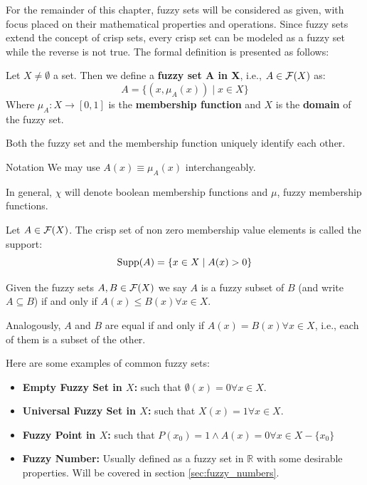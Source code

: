 For the remainder of this chapter, fuzzy sets will be considered as given, with focus placed on their mathematical properties and operations. Since fuzzy sets extend the concept of crisp sets, every crisp set can be modeled as a fuzzy set while the reverse is not true. The formal definition is presented as follows:

\begin{definition}
    Let $X\neq\emptyset$ a set. Then we define a \textbf{fuzzy set A in X}, i.e., $A \in \mathcal{F}(X)$ as:
    \[A=\{(x,\mu_A(x))\mid x\in X\}\]
    Where $\mu_A:X\longrightarrow [0,1]$ is the \textbf{membership function} and $X$ is the \textbf{domain} of the fuzzy set.
\end{definition}

\begin{remark}
     Both the fuzzy set and the membership function uniquely identify each other.
\end{remark}

\begin{notation}{Notation}
    We may use \( A(x) \equiv \mu_A(x) \) interchangeably.

    In general, $\chi$ will denote boolean membership functions and $\mu$, fuzzy membership functions.
\end{notation}



\begin{definition}[Support]
    Let $A \in \mathcal{F}(X)$. The crisp set of non zero membership value elements is called the support:
    \[\textnormal{Supp}(A)=\{x\in X \mid A(x)>0\}\]
\end{definition}

\begin{definition}
    Given the fuzzy sets $A, B \in \mathcal{F}(X)$ we say $A$ is a fuzzy subset of $B$ (and write $A \subseteq B$) if and only if $A(x)
    \leq B(x) \forall x \in X$.

    Analogously, $A$ and $B$ are equal if and only if $A(x)=B(x) \forall x \in X$, i.e., each of them is a subset of the other.
\end{definition}

\begin{example}
    Here are some examples of common fuzzy sets:
    \begin{itemize}
        \item \textbf{Empty Fuzzy Set in $X$:} such that $\emptyset(x)=0 \forall x \in X$.
        \item \textbf{Universal Fuzzy Set in $X$:} such that $X(x)=1  \forall x \in X$.
        \item \textbf{Fuzzy Point in $X$:} such that $P(x_0)=1 \land A(x)=0 \forall x \in X-\{x_0\}$
        \item \textbf{Fuzzy Number:} Usually defined as a fuzzy set in $\mathbb{R}$ with some desirable properties. Will be covered in section \ref{sec:fuzzy_numbers}.
    \end{itemize}
\end{example}
